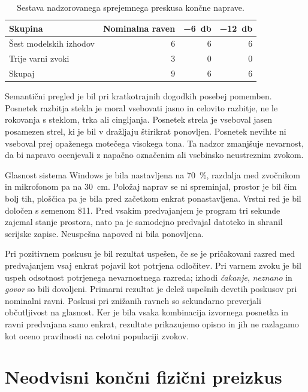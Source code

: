 \begin{table}[!ht]
  \centering
  \caption{Sestava nadzorovanega sprejemnega preskusa končne naprave.}
  \label{tab:sprejemni-nabor}
  \begin{tabular}{lrrr}
    \toprule
    Skupina & Nominalna raven & \SI{-6}{\decibel} & \SI{-12}{\decibel} \\
    \midrule
    Šest modelskih izhodov & 6 & 6 & 6 \\
    Trije varni zvoki & 3 & 0 & 0 \\
    \midrule
    Skupaj & 9 & 6 & 6 \\
    \bottomrule
  \end{tabular}
\end{table}

Semantični pregled je bil pri kratkotrajnih dogodkih posebej pomemben.
Posnetek razbitja stekla je moral vsebovati jasno in celovito razbitje, ne le
rokovanja s steklom, trka ali cingljanja. Posnetek strela je vseboval jasen
posamezen strel, ki je bil v dražljaju štirikrat ponovljen. Posnetek nevihte ni
vseboval prej opaženega motečega visokega tona. Ta nadzor zmanjšuje nevarnost,
da bi napravo ocenjevali z napačno označenim ali vsebinsko neustreznim zvokom.

Glasnost sistema Windows je bila nastavljena na \SI{70}{\percent}, razdalja med
zvočnikom in mikrofonom pa na \SI{30}{\centi\meter}. Položaj naprav se ni
spreminjal, prostor je bil čim bolj tih, ploščica pa je bila pred začetkom
enkrat ponastavljena. Vrstni red je bil določen s semenom 811. Pred vsakim
predvajanjem je program tri sekunde zajemal stanje prostora, nato pa je
samodejno predvajal datoteko in shranil serijske zapise. Neuspešna napoved ni
bila ponovljena.

Pri pozitivnem poskusu je bil rezultat uspešen, če se je pričakovani razred med
predvajanjem vsaj enkrat pojavil kot potrjena odločitev. Pri varnem zvoku je bil
uspeh odsotnost potrjenega nevarnostnega razreda; izhodi \emph{čakanje},
\emph{neznano} in \emph{govor} so bili dovoljeni. Primarni rezultat je delež
uspešnih devetih poskusov pri nominalni ravni. Poskusi pri znižanih ravneh so
sekundarno preverjali občutljivost na glasnost. Ker je bila vsaka kombinacija
izvornega posnetka in ravni predvajana samo enkrat, rezultate prikazujemo
opisno in jih ne razlagamo kot oceno pravilnosti na celotni populaciji zvokov.

\section{Neodvisni končni fizični preizkus}
\label{sec:metodologija-koncni}

